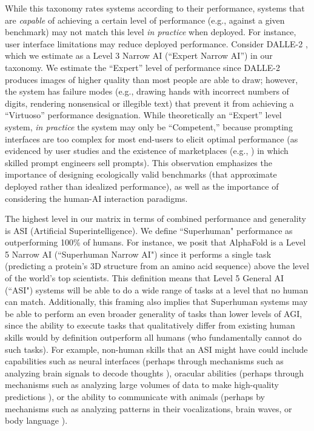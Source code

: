 \documentclass{article}
\theoremstyle{plain}
\theoremstyle{definition}
\theoremstyle{remark}
\begin{document}
While this taxonomy rates systems according to their performance, systems that are \textit{capable} of achieving a certain level of performance (e.g., against a given benchmark) may not match this level \textit{in practice} when deployed. For instance, user interface limitations may reduce deployed performance. Consider DALLE-2 \citep{dalle2}, which we estimate as a Level 3 Narrow AI (“Expert Narrow AI”) in our taxonomy. We estimate the “Expert” level of performance since DALLE-2 produces images of higher quality than most people are able to draw; however, the system has failure modes (e.g., drawing hands with incorrect numbers of digits, rendering nonsensical or illegible text) that prevent it from achieving a “Virtuoso” performance designation.  While theoretically an “Expert” level system, \textit{in practice} the system may only be “Competent,” because prompting interfaces are too complex for most end-users to elicit optimal performance (as evidenced by user studies \citep{cantprompt} and the existence of marketplaces (e.g., \citet{promptbase}) in which skilled prompt engineers sell prompts). This observation emphasizes the importance of designing ecologically valid benchmarks (that approximate deployed rather than idealized performance), as well as the importance of considering the human-AI interaction paradigms. %

The highest level in our matrix in terms of combined performance and generality is ASI (Artificial Superintelligence). We define ``Superhuman" performance as outperforming 100\% of humans. For instance, we posit that AlphaFold \citep{alphafold1, alphafold2} is a Level 5 Narrow AI (``Superhuman Narrow AI") since it performs a single task (predicting a protein’s 3D structure from an amino acid sequence) above the level of the world’s top scientists. This definition means that Level 5 General AI (``ASI") systems will be able to do a wide range of tasks at a level that no human can match. Additionally, this framing also implies that Superhuman systems may be able to perform an even broader generality of tasks than lower levels of AGI, since the ability to execute tasks that qualitatively differ from existing human skills would by definition outperform all humans (who fundamentally cannot do such tasks). For example, non-human skills that an ASI might have could include capabilities such as neural interfaces (perhaps through mechanisms such as analyzing brain signals to decode thoughts \citep{neuralUI, musicBCI}), oracular abilities (perhaps through mechanisms such as analyzing large volumes of data to make high-quality predictions \citep{schoenegger2023large}), or the ability to communicate with animals (perhaps by mechanisms such as analyzing patterns in their vocalizations, brain waves, or body language \citep{goldwasser2023theory, ANDREAS2022104393}).
\end{document}
